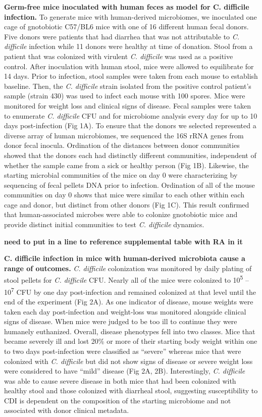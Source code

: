 \documentclass[11pt,]{article}
\begin{document}
\textbf{Germ-free mice inoculated with human feces as model for C.
difficile infection.} To generate mice with human-derived microbiomes,
we inoculated one cage of gnotobiotic C57/BL6 mice with one of 16
different human fecal donors. Five donors were patients that had
diarrhea that was not attributable to \emph{C. difficile} infection
while 11 donors were healthy at time of donation. Stool from a patient
that was colonized with virulent \emph{C. difficile} was used as a
positive control. After inoculation with human stool, mice were allowed
to equilibrate for 14 days. Prior to infection, stool samples were taken
from each mouse to establish baseline. Then, the \emph{C. difficile}
strain isolated from the positive control patient's sample (strain 430)
was used to infect each mouse with 100 spores. Mice were monitored for
weight loss and clinical signs of disease. Fecal samples were taken to
enumerate \emph{C. difficile} CFU and for microbiome analysis every day
for up to 10 days post-infection (Fig 1A). To ensure that the donors we
selected represented a diverse array of human microbiomes, we sequenced
the 16S rRNA genes from donor fecal inocula. Ordination of the distances
between donor communities showed that the donors each had distinctly
different communities, independent of whether the sample came from a
sick or healthy person (Fig 1B). Likewise, the starting microbial
communities of the mice on day 0 were characterizing by sequencing of
fecal pellets DNA prior to infection. Ordination of all of the mouse
communities on day 0 shows that mice were similar to each other within
each cage and donor, but distinct from other donors (Fig 1C). This
result confirmed that human-associated microbes were able to colonize
gnotobiotic mice and provide distinct initial communities to test
\emph{C. difficile} dynamics.

\textbf{need to put in a line to reference supplemental table with RA in
it}

\textbf{C. difficile infection in mice with human-derived microbiota
cause a range of outcomes.} \emph{C. difficile} colonization was
monitored by daily plating of stool pellets for \emph{C. difficile} CFU.
Nearly all of the mice were colonized to 10\textsuperscript{5} --
10\textsuperscript{7} CFU by one day post-infection and remained
colonized at that level until the end of the experiment (Fig 2A). As one
indicator of disease, mouse weights were taken each day post-infection
and weight-loss was monitored alongside clinical signs of disease. When
mice were judged to be too ill to continue they were humanely
euthanized. Overall, disease phenotypes fell into two classes. Mice that
became severely ill and lost 20\% or more of their starting body weight
within one to two days post-infection were classified as ``severe''
whereas mice that were colonized with \emph{C. difficile} but did not
show signs of disease or severe weight loss were considered to have
``mild'' disease (Fig 2A, 2B). Interestingly, \emph{C. difficile} was
able to cause severe disease in both mice that had been colonized with
healthy stool and those colonized with diarrheal stool, suggesting
susceptibility to CDI is dependent on the composition of the starting
microbiome and not associated with donor clinical metadata.
\end{document}
